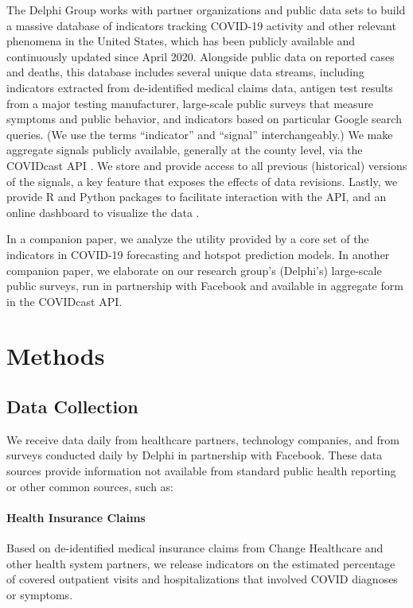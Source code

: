 \documentclass[9pt,twocolumn,twoside,lineno]{pnas-new}
\begin{document}
The Delphi Group works with partner organizations and public data sets to build
a massive database of indicators tracking COVID-19 activity and other relevant
phenomena in the United States, which has been publicly available and
continuously updated since April 2020. Alongside public data on reported cases
and deaths, this database includes several unique data streams, including
indicators extracted from de-identified medical claims data, antigen test
results from a major testing manufacturer, large-scale public surveys that
measure symptoms and public behavior, and indicators based on particular Google
search queries. (We use the terms ``indicator'' and ``signal'' interchangeably.)
We make aggregate signals publicly available, generally at the county level, via
the COVIDcast API \cite{CovidcastAPI}. We store and provide access to all
previous (historical) versions of the signals, a key feature that exposes the
effects of data revisions.  Lastly, we provide R \cite{CovidcastR} and Python
\cite{CovidcastPy} packages to facilitate interaction with the API, and an
online dashboard to visualize the data \cite{CovidcastViz}. 

In a companion paper, we analyze the utility provided by a core set of the
indicators in COVID-19 forecasting and hotspot prediction models.  In another
companion paper, we elaborate on our research group's (Delphi's) large-scale
public surveys, run in partnership with Facebook and available in aggregate form
in the COVIDcast API.

\section{Methods}

\subsection{Data Collection}

We receive data daily from healthcare partners, technology companies, and from
surveys conducted daily by Delphi in partnership with Facebook. These data
sources provide information not available from standard public health reporting
or other common sources, such as:

\paragraph{Health Insurance Claims} Based on de-identified medical insurance 
claims from Change Healthcare and other health system partners, we release
indicators on the estimated percentage of covered outpatient visits and
hospitalizations that involved COVID diagnoses or symptoms.
\end{document}
